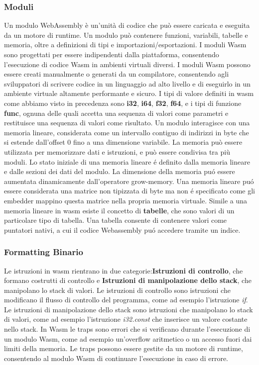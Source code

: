 \documentclass[../../main.tex]{subfiles}
\begin{document}
\subsubsection{Moduli}
Un modulo WebAssembly è un'unità di codice che può essere caricata e eseguita da un motore di runtime. Un modulo può contenere funzioni, variabili, tabelle e memoria, oltre a definizioni di tipi e importazioni/esportazioni. I moduli Wasm sono progettati per essere indipendenti dalla piattaforma, consentendo l'esecuzione di codice Wasm in ambienti virtuali diversi. I moduli Wasm possono essere creati manualmente o generati da un compilatore, consentendo agli sviluppatori di scrivere codice in un linguaggio ad alto livello e di eseguirlo in un ambiente virtuale altamente performante e sicuro.
I tipi di valore definiti in wasm come abbiamo visto in precedenza sono \textbf{i32}, \textbf{i64}, \textbf{f32}, \textbf{f64}, e i tipi di funzione \textbf{func}, ognuna delle quali accetta una sequenza di valori come parametri e restituisce una sequenza di valori come risultato.
Un modulo interagisce con una memoria lineare, considerata come un intervallo contiguo di indirizzi in byte che si estende dall'offset 0 fino a una dimensione variabile. La memoria può essere utilizzata per memorizzare dati e istruzioni, e può essere condivisa tra più moduli.
Lo stato iniziale di una memoria lineare é definito dalla memoria lineare e dalle sezioni dei dati del modulo. La dimensione della memoria puó essere aumentata dinamicamente dall'operatore grow-memory.
Una memoria lineare puó essere considerata una matrice non tipizzata di byte ma non é specificato come gli embedder mappino questa matrice nella propria memoria virtuale.
Simile a una memoria lineare in wasm esiste il concetto di \textbf{tabelle}, che sono valori di un particolare tipo di tabella.
Una tabella consente di contenere valori come puntatori nativi, a cui il codice Webassembly puó accedere tramite un indice.

\subsubsection{Formatting Binario}
Le istruzioni in wasm rientrano in due categorie:\textbf{Istruzioni di controllo}, che formano costrutti di controllo e \textbf{Istruzioni di manipolazione dello stack}, che manipolano lo stack di valori.
Le istruzioni di controllo sono istruzioni che modificano il flusso di controllo del programma, come ad esempio l'istruzione \textit{if}.
Le istruzioni di manipolazione dello stack sono istruzioni che manipolano lo stack di valori, come ad esempio l'istruzione \textit{i32.const} che inserisce un valore costante nello stack.
In Wasm le traps sono errori che si verificano durante l'esecuzione di un modulo Wasm, come ad esempio un'overflow aritmetico o un accesso fuori dai limiti della memoria. Le traps possono essere gestite da un motore di runtime, consentendo al modulo Wasm di continuare l'esecuzione in caso di errore.
\end{document}

